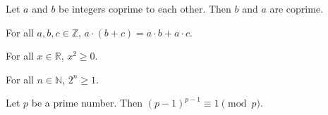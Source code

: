 \begin{theorem}
Let $a$ and $b$ be integers coprime to each other.
Then $b$ and $a$ are coprime.
\end{theorem}


\begin{theorem}[Distributivity]
For all $a, b, c \in \mathbb{Z}$, $a \cdot (b + c) = a \cdot b + a \cdot c$.
\end{theorem}


\begin{theorem}
For all $x \in \mathbb{R}$, $x^2 \geq 0$.
\end{theorem}


\begin{theorem}
For all $n \in \mathbb{N}$, $2^n \geq 1$.
\end{theorem}


\begin{theorem}[Wilson]
Let $p$ be a prime number. Then $(p - 1)^{p - 1} \equiv 1 \pmod{p}$.
\end{theorem}


